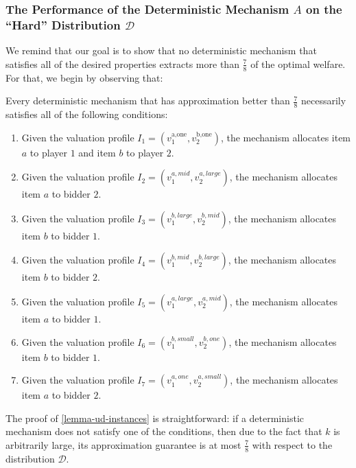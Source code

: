 \subsubsection[The Performance of the Deterministic Mechanism A on the "Hard" Distribution D]{The Performance of the Deterministic Mechanism $A$ on the ``Hard'' Distribution $\mathcal{D}$}\label{subsubsec-performance-ud}
We remind that our goal is to show that no deterministic mechanism that satisfies all of the desired properties extracts more than $\frac{7}{8}$ of the optimal welfare. For that, we begin by observing that:
\begin{lemma}\label{lemma-ud-instances}
Every deterministic mechanism that has approximation better than $\frac{7}{8}$ necessarily satisfies all of the following conditions:
\begin{enumerate}
    \item Given the valuation profile $I_1 = (v_1^{\text{a,one}}, v_2^{\text{b,one}})$, the mechanism
    allocates item $a$ to player $1$ and item $b$ to player $2$. \label{condi-1-ud}
\item Given the valuation profile $I_2 = (v_1^{a,mid}, v_2^{a,large})$, the mechanism allocates item $a$ to bidder $2$. \label{condi-2-ud}

    \item Given the valuation profile $I_3 = (v_1^{b,large}, v_2^{b,mid})$, the mechanism allocates item $b$  to bidder $1$.
    \label{condi-3-ud}
\item Given the valuation profile $I_4 = (v_1^{b,mid}, v_2^{b,large})$, the mechanism allocates item $b$ to bidder $2$. \label{condi-4-ud}
\item Given the valuation profile $I_5 = (v_1^{a,large}, v_2^{a,mid})$, the mechanism allocates item $a$ to bidder $1$. \label{condi-5-ud}
\item Given the valuation profile $I_6 = (v_1^{b,small}, v_2^{b,one})$, the mechanism allocates item $b$ to bidder $1$. \label{condi-6-ud}
\item Given the valuation profile $I_7 = (v_1^{a,one}, v_2^{a,small})$, the mechanism allocates item $a$ to bidder $2$. 
\end{enumerate}
\end{lemma}
The proof of \cref{lemma-ud-instances} is straightforward: if a deterministic mechanism does not satisfy one of the conditions, then due to the fact that $k$ is arbitrarily large, its approximation guarantee is at most $\frac{7}{8}$ with respect to the distribution $\mathcal{D}$.

